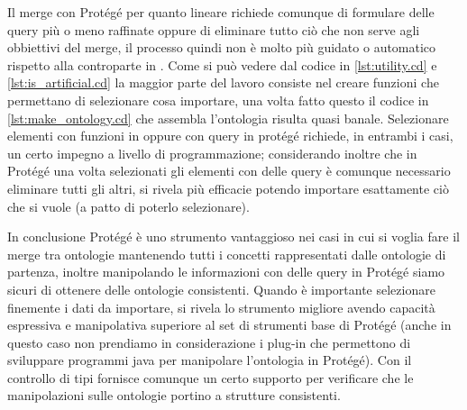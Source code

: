 Il merge con Protégé per quanto lineare richiede comunque di formulare delle query più o meno raffinate oppure di eliminare tutto ciò che non serve agli obbiettivi del merge, il processo quindi non è molto più guidato o automatico rispetto alla controparte in \cduce. Come si può vedere dal codice in \ref{lst:utility.cd} e \ref{lst:is_artificial.cd} la maggior parte del lavoro consiste nel creare funzioni che permettano di selezionare cosa importare, una volta fatto questo il codice in \ref{lst:make_ontology.cd} che assembla l'ontologia risulta quasi banale. Selezionare elementi con funzioni in \cduce oppure con query in protégé richiede, in entrambi i casi, un certo impegno a livello di programmazione; considerando inoltre che in Protégé una volta selezionati gli elementi con delle query è comunque necessario eliminare tutti gli altri, \cduce si rivela più efficacie potendo importare esattamente ciò che si vuole (a patto di poterlo selezionare).

In conclusione Protégé è uno strumento vantaggioso nei casi in cui si voglia fare il merge tra ontologie mantenendo tutti i concetti rappresentati dalle ontologie di partenza, inoltre manipolando le informazioni con delle query in Protégé siamo sicuri di ottenere delle ontologie consistenti. Quando è importante selezionare finemente i dati da importare, \cduce si rivela lo strumento migliore avendo capacità espressiva e manipolativa superiore al set di strumenti base di Protégé (anche in questo caso non prendiamo in considerazione i plug-in che permettono di sviluppare programmi java per manipolare l'ontologia in Protégé). Con il controllo di tipi \cduce fornisce comunque un certo supporto per verificare che le manipolazioni sulle ontologie portino a strutture consistenti.